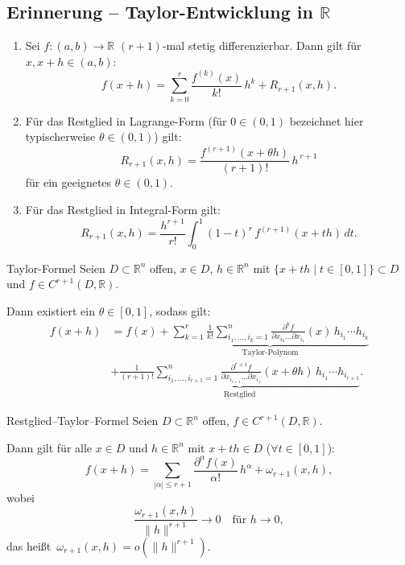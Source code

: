 \subsection*{Erinnerung -- Taylor-Entwicklung in $\mathbb{R}$}
\begin{enumerate}
    \item Sei $f:(a,b)\to\mathbb{R}$ $(r+1)$-mal stetig differenzierbar. Dann gilt für $x,x+h\in(a,b)$:
    $$
    f(x+h)=\sum_{k=0}^{r}\frac{f^{(k)}(x)}{k!}\,h^k+R_{r+1}(x,h).
    $$

    \item Für das Restglied in Lagrange-Form (für $0\in(0,1)$ bezeichnet hier typischerweise $\theta\in(0,1)$) gilt:
    $$
    R_{r+1}(x,h)=\frac{f^{(r+1)}(x+\theta h)}{(r+1)!}\,h^{\,r+1}
    $$
    für ein geeignetes $\theta\in(0,1)$.
    \item Für das Restglied in Integral-Form gilt:
    $$
    R_{r+1}(x,h)=\frac{h^{r+1}}{r!}\int_0^1 (1-t)^r\,f^{(r+1)}(x+th)\,dt.
    $$
\end{enumerate}

\begin{satz}{Taylor-Formel}
    Seien $D\subset\mathbb{R}^n$ offen, $x\in D$, $h\in\mathbb{R}^n$ mit $\{x+th\mid t\in[0,1]\}\subset D$ und $f\in C^{r+1}(D,\mathbb{R})$.

    Dann existiert ein $\theta\in[0,1]$, sodass gilt:
    $$
    \begin{aligned}
        f(x+h) & =f(x)
        +\underbrace{\sum_{k=1}^r\frac{1}{k!}\sum_{i_1,\dots,i_k=1}^n
        \frac{\partial^k f}{\partial x_{i_k}\dots\partial x_{i_1}}(x)\,
        h_{i_1}\cdots h_{i_k}}_{\text{Taylor-Polynom}} \\
        & +\underbrace{\frac{1}{(r+1)!}\sum_{i_1,\dots,i_{r+1}=1}^n
        \frac{\partial^{r+1}f}{\partial x_{i_{r+1}}\dots\partial x_{i_1}}(x+\theta h)\,
        h_{i_1}\cdots h_{i_{r+1}}}_{\text{Restglied}}.
    \end{aligned}
    $$
        
\end{satz}

\begin{korollar}{Restglied--Taylor--Formel}
    Seien $D\subset\mathbb{R}^n$ offen, $f\in C^{r+1}(D,\mathbb{R})$.

    Dann gilt für alle $x\in D$ und $h\in\mathbb{R}^n$ mit $x+th\in D$ ($\forall t\in[0,1]$):
    $$
    f(x+h)=\sum_{|\alpha|\le r+1}\frac{\partial^\alpha f(x)}{\alpha!}\,h^\alpha+\omega_{r+1}(x,h),
    $$
    wobei
    $$
    \frac{\omega_{r+1}(x,h)}{\|h\|^{r+1}}\longrightarrow 0\quad\text{für }h\to 0,
    $$
    das heißt\ $\omega_{r+1}(x,h)=o(\|h\|^{r+1})$.
\end{korollar}

